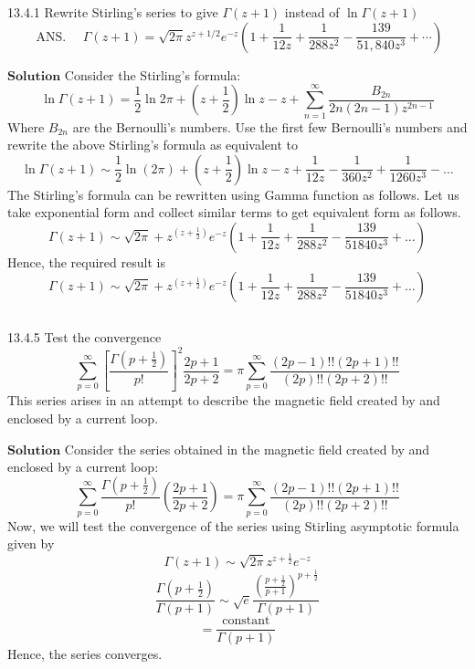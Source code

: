 \documentclass{article}
\begin{document}
\begin{flushleft}


\begin{mybox}{13.4.1}
Rewrite Stirling's series to give $\Gamma(z+1)$ instead of $\ln \Gamma(z+1)$
$$
\text { ANS. } \quad \Gamma(z+1)=\sqrt{2 \pi} z^{z+1 / 2} e^{-z}\left(1+\frac{1}{12 z}+\frac{1}{288 z^{2}}-\frac{139}{51,840 z^{3}}+\cdots\right)
$$
\end{mybox}
$\boxed{\textbf{Solution}}$ Consider the Stirling's formula: 
$$\ln \Gamma(z+1)=\frac{1}{2} \ln 2 \pi+\left(z+\frac{1}{2}\right) \ln z-z+\sum_{n=1}^{\infty} \frac{B_{2 n}}{2 n(2 n-1) z^{2 n-1}}$$
Where $B_{2 n}$ are the Bernoulli's numbers. Use the first few Bernoulli's numbers and rewrite the above Stirling's formula as equivalent to
$$\ln \Gamma(z+1) \sim \frac{1}{2} \ln (2 \pi)+\left(z+\frac{1}{2}\right) \ln z-z+\frac{1}{12 z}-\frac{1}{360 z^{2}}+\frac{1}{1260 z^{3}}-\ldots$$
The Stirling's formula can be rewritten using Gamma function as follows.
Let us take exponential form and collect similar terms to get equivalent form as follows.
$$
\Gamma(z+1) \sim \sqrt{2 \pi}+z^{\left(z+\frac{1}{2}\right)} e^{-z}\left(1+\frac{1}{12 z}+\frac{1}{288 z^{2}}-\frac{139}{51840 z^{3}}+\ldots\right)
$$
Hence, the required result is $$\Gamma(z+1) \sim \sqrt{2 \pi}+z^{\left(z+\frac{1}{2}\right)} e^{-z}\left(1+\frac{1}{12 z}+\frac{1}{288 z^{2}}-\frac{139}{51840 z^{3}}+\ldots\right)$$

$$$$


\begin{mybox}{13.4.5}
Test the convergence
$$
\sum_{p=0}^{\infty}\left[\frac{\Gamma\left(p+\frac{1}{2}\right)}{p !}\right]^{2} \frac{2 p+1}{2 p+2}=\pi \sum_{p=0}^{\infty} \frac{(2 p-1) ! !(2 p+1) ! !}{(2 p) ! !(2 p+2) ! !}
$$
This series arises in an attempt to describe the magnetic field created by and enclosed by a current loop.
\end{mybox}
$\boxed{\textbf{Solution}}$ Consider the series obtained in the magnetic field created by and enclosed by a current loop:
$$
\sum_{p=0}^{\infty} \frac{\Gamma\left(p+\frac{1}{2}\right)}{p !}\left(\frac{2 p+1}{2 p+2}\right)=\pi \sum_{p=0}^{\infty} \frac{(2 p-1) ! !(2 p+1) ! !}{(2 p) ! !(2 p+2) ! !}
$$
Now, we will test the convergence of the series using Stirling asymptotic formula given by
$$
\Gamma(z+1) \sim \sqrt{2 \pi} z^{z+\frac{1}{2}} e^{-z}
$$
$$
\frac{\Gamma\left(p+\frac{1}{2}\right)}{\Gamma(p+1)} \sim \sqrt{e} \frac{\left(\frac{p+\frac{1}{2}}{p+1}\right)^{p+\frac{1}{2}}}{\Gamma(p+1)}
$$
$$
=\frac{\text { constant }}{\Gamma(p+1)}
$$
Hence, the series converges.


\end{flushleft}
\end{document}
